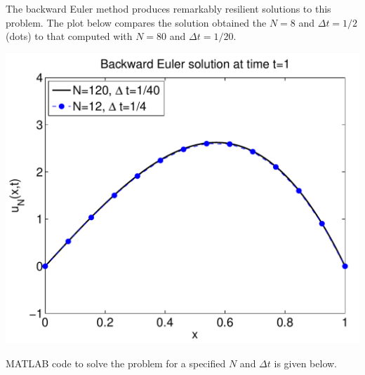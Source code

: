 {\begin{solution}
\begin{enumerate}
      The backward Euler method produces remarkably resilient solutions
      to this problem.
      The plot below compares the solution obtained the $N=8$ 
      and $\Delta t = 1/2$ (dots) to that
      computed with $N=80$ and $\Delta t = 1/20$.

\begin{center}
\includegraphics[scale=0.6]{femex1sol}
\end{center}

     MATLAB code to solve the problem for a specified $N$ and $\Delta t$
     is given below.


\end{enumerate}
\end{solution}}{}